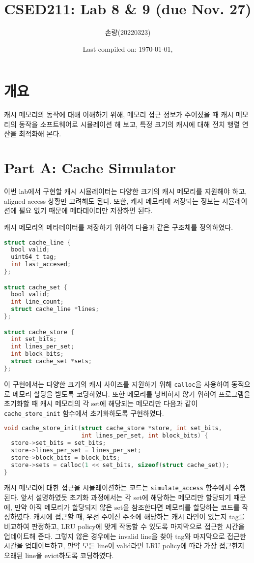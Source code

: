 \documentclass{scrartcl}
\title{CSED211: Lab 8 \& 9 (due Nov. 27)}
\author{손량(20220323)}
\date{Last compiled on: \today, \currenttime}
\begin{document}
\maketitle

\section{개요}
캐시 메모리의 동작에 대해 이해하기 위해, 메모리 접근 정보가 주어졌을 때 캐시
메모리의 동작을 소프트웨어로 시뮬레이션 해 보고, 특정 크기의 캐시에 대해 전치
행렬 연산을 최적화해 본다.

\section{Part A: Cache Simulator}
이번 lab에서 구현할 캐시 시뮬레이터는 다양한 크기의 캐시 메모리를 지원해야
하고, aligned access 상황만 고려해도 된다. 또한, 캐시 메모리에 저장되는 정보는
시뮬레이션에 필요 없기 때문에 메타데이터만 저장하면 된다.

캐시 메모리의 메타데이터를 저장하기 위하여 다음과 같은 구조체를 정의하였다.
\begin{lstlisting}[language=C]
struct cache_line {
  bool valid;
  uint64_t tag;
  int last_accesed;
};

struct cache_set {
  bool valid;
  int line_count;
  struct cache_line *lines;
};

struct cache_store {
  int set_bits;
  int lines_per_set;
  int block_bits;
  struct cache_set *sets;
};
\end{lstlisting}

이 구현에서는 다양한 크기의 캐시 사이즈를 지원하기 위해 \texttt{calloc}을
사용하여 동적으로 메모리 할당을 받도록 코딩하였다. 또한 메모리를 낭비하지 않기
위하여 프로그램을 초기화할 때 캐시 메모리의 각 set에 해당되는 메모리만 다음과
같이 \texttt{cache\_store\_init} 함수에서 초기화하도록 구현하였다.
\begin{lstlisting}[language=C]
void cache_store_init(struct cache_store *store, int set_bits,
                      int lines_per_set, int block_bits) {
  store->set_bits = set_bits;
  store->lines_per_set = lines_per_set;
  store->block_bits = block_bits;
  store->sets = calloc(1 << set_bits, sizeof(struct cache_set));
}
\end{lstlisting}

캐시 메모리에 대한 접근을 시뮬레이션하는 코드는 \texttt{simulate\_access}
함수에서 수행된다. 앞서 설명하였듯 초기화 과정에서는 각 set에 해당하는 메모리만
할당되기 때문에, 만약 아직 메모리가 할당되지 않은 set을 참조한다면 메모리를
할당하는 코드를 작성하였다. 캐시에 접근할 때, 우선 주어진 주소에 해당하는 캐시
라인이 있는지 tag를 비교하여 판정하고, LRU policy에 맞게 작동할 수 있도록
마지막으로 접근한 시간을 업데이트해 준다. 그렇지 않은 경우에는 invalid line을
찾아 tag와 마지막으로 접근한 시간을 업데이트하고, 만약 모든 line이 valid라면
LRU policy에 따라 가장 접근한지 오래된 line을 evict하도록 코딩하였다.
\end{document}
